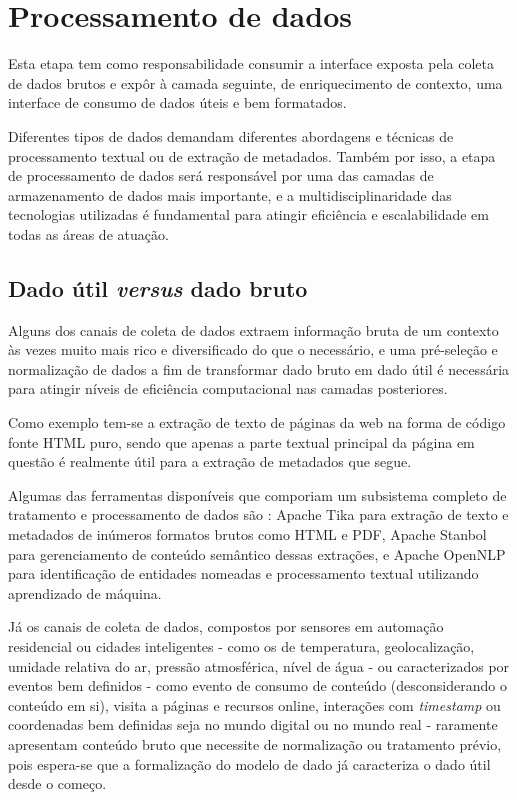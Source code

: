 \chapter{Processamento de dados} \label{c:processamento_de_dados}

Esta etapa tem como responsabilidade consumir a interface exposta pela coleta de dados brutos e expôr à camada seguinte, de enriquecimento de contexto, uma interface de consumo de dados úteis e bem formatados.

Diferentes tipos de dados demandam diferentes abordagens e técnicas de processamento textual ou de extração de metadados. Também por isso, a etapa de processamento de dados será responsável por uma das camadas de armazenamento de dados mais importante, e a multidisciplinaridade das tecnologias utilizadas é fundamental para atingir eficiência e escalabilidade em todas as áreas de atuação.

\section{Dado útil \textit{versus} dado bruto} \label{s:dado_util_vs_dado_bruto}

Alguns dos canais de coleta de dados extraem informação bruta de um contexto às vezes muito mais rico e diversificado do que o necessário, e uma pré-seleção e normalização de dados a fim de transformar dado bruto em dado útil é necessária para atingir níveis de eficiência computacional nas camadas posteriores.

Como exemplo tem-se a extração de texto de páginas da web na forma de código fonte HTML puro, sendo que apenas a parte textual principal da página em questão é realmente útil para a extração de metadados que segue.

Algumas das ferramentas disponíveis que comporiam um subsistema completo de tratamento e processamento de dados são \cite{ital:jung-andrew}: Apache Tika \cite{apache:tika} para extração de texto e metadados de inúmeros formatos brutos como HTML e PDF, Apache Stanbol \cite{apache:stanbol} para gerenciamento de conteúdo semântico dessas extrações, e Apache OpenNLP \cite{apache:opennlp} para identificação de entidades nomeadas e processamento textual utilizando aprendizado de máquina.

Já os canais de coleta de dados, compostos por sensores em automação residencial ou cidades inteligentes - como os de temperatura, geolocalização, umidade relativa do ar, pressão atmosférica, nível de água - ou caracterizados por eventos bem definidos - como evento de consumo de conteúdo (desconsiderando o conteúdo em si), visita a páginas e recursos online, interações com \textit{timestamp} ou coordenadas bem definidas seja no mundo digital ou no mundo real - raramente apresentam conteúdo bruto que necessite de normalização ou tratamento prévio, pois espera-se que a formalização do modelo de dado já caracteriza o dado útil desde o começo.

